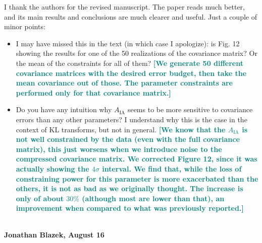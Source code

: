 \documentclass{article}
\newcommand\reply[1]{{\bf {\textcolor{teal}{[#1]}}}}
\begin{document}
    I thank the authors for the revised manuscript. The paper reads much better, and its main results and conclusions are much clearer and useful. Just a couple of minor points:
    \begin{itemize}
        \item I may have missed this in the text (in which case I apologize): is Fig. 12 showing the results for one of the 50 realizations of the covariance matrix? Or the mean of the constraints for all of them? \reply{We generate 50 different covariance matrices with the desired error budget, then take the mean covariance out of those. The parameter constraints are performed only for that covariance matrix.}
        \item Do you have any intuition why $A_{\mathrm{IA}}$ seems to be more sensitive to covariance errors than any other parameters? I understand why this is the case in the context of KL transforms, but not in general. \reply{We know that the $A_{\mathrm{IA}}$ is not well constrained by the data (even with the full covariance matrix), this just worsens when we introduce noise to the compressed covariance matrix. We corrected Figure 12, since it was actually showing the $4\sigma$ interval. We find that, while the loss of constraining power for this parameter is more exacerbated than the others, it is not as bad as we originally thought. The increase is only of about $30\%$ (although most are lower than that), an improvement when compared to what was previously reported.}\\  \\
    \end{itemize}
	
	
	\textbf{Jonathan Blazek, August 16} \\
\end{document}
